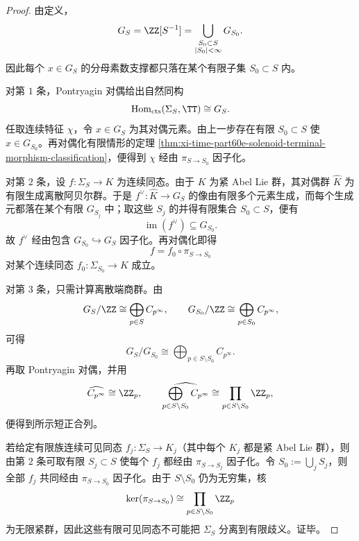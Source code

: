\begin{proof}
由定义，
\[
G_S=\ZZ[S^{-1}]=\bigcup_{\substack{S_0\subset S\\ |S_0|<\infty}}G_{S_0}.
\]
因此每个 \(x\in G_S\) 的分母素数支撑都只落在某个有限子集 \(S_0\subset S\) 内。

对第 \(1\) 条，Pontryagin 对偶给出自然同构
\[
\operatorname{Hom}_{\mathrm{cts}}(\Sigma_S,\TT)\cong G_S.
\]
任取连续特征 \(\chi\)，令 \(x\in G_S\) 为其对偶元素。由上一步存在有限 \(S_0\subset S\) 使 \(x\in G_{S_0}\)。再对偶化有限情形的定理 \ref{thm:xi-time-part60e-solenoid-terminal-morphism-classification}，便得到 \(\chi\) 经由 \(\pi_{S\to S_0}\) 因子化。

对第 \(2\) 条，设 \(f:\Sigma_S\to K\) 为连续同态。由于 \(K\) 为紧 Abel Lie 群，其对偶群 \(\widehat K\) 为有限生成离散阿贝尔群。于是 \(f^\vee:\widehat K\to G_S\) 的像由有限多个元素生成，而每个生成元都落在某个有限 \(G_{S_j}\) 中；取这些 \(S_j\) 的并得有限集合 \(S_0\subset S\)，便有
\[
\operatorname{im}(f^\vee)\subseteq G_{S_0}.
\]
故 \(f^\vee\) 经由包含 \(G_{S_0}\hookrightarrow G_S\) 因子化。再对偶化即得
\[
f=f_0\circ \pi_{S\to S_0}
\]
对某个连续同态 \(f_0:\Sigma_{S_0}\to K\) 成立。

对第 \(3\) 条，只需计算离散端商群。由
\[
G_S/\ZZ\cong \bigoplus_{p\in S}C_{p^\infty},
\qquad
G_{S_0}/\ZZ\cong \bigoplus_{p\in S_0}C_{p^\infty},
\]
可得
\[
G_S/G_{S_0}
\cong
\bigoplus_{p\in S\setminus S_0}C_{p^\infty}.
\]
再取 Pontryagin 对偶，并用
\[
\widehat{C_{p^\infty}}\cong \ZZ_p,
\qquad
\widehat{\bigoplus_{p\in S\setminus S_0}C_{p^\infty}}
\cong
\prod_{p\in S\setminus S_0}\ZZ_p,
\]
便得到所示短正合列。

若给定有限族连续可见同态 \(f_j:\Sigma_S\to K_j\)（其中每个 \(K_j\) 都是紧 Abel Lie 群），则由第 \(2\) 条可取有限 \(S_j\subset S\) 使每个 \(f_j\) 都经由 \(\pi_{S\to S_j}\) 因子化。令 \(S_0:=\bigcup_j S_j\)，则全部 \(f_j\) 共同经由 \(\pi_{S\to S_0}\) 因子化。由于 \(S\setminus S_0\) 仍为无穷集，核
\[
\ker(\pi_{S\to S_0})\cong \prod_{p\in S\setminus S_0}\ZZ_p
\]
为无限紧群，因此这些有限可见同态不可能把 \(\Sigma_S\) 分离到有限歧义。证毕。
\end{proof}

